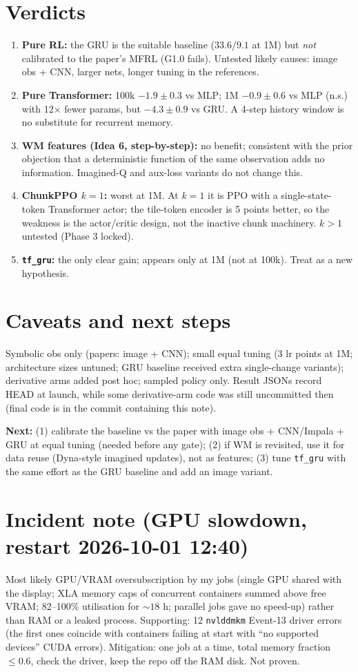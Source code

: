 \documentclass[10pt]{article}
\newcommand{\p}[1]{\texttt{\small #1}}
\begin{document}
\section*{Verdicts}
\begin{enumerate}\itemsep0pt
\item \textbf{Pure RL:} the GRU is the suitable baseline ($33.6/9.1$ at 1M) but \emph{not} calibrated to the paper's MFRL (G1.0 fails). Untested likely causes: image obs + CNN, larger nets, longer tuning in the references.
\item \textbf{Pure Transformer:} 100k $-1.9\pm0.3$ vs MLP; 1M $-0.9\pm0.6$ vs MLP (n.s.) with 12$\times$ fewer params, but $-4.3\pm0.9$ vs GRU. A 4-step history window is no substitute for recurrent memory.
\item \textbf{WM features (Idea 6, step-by-step):} no benefit; consistent with the prior objection that a deterministic function of the same observation adds no information. Imagined-Q and aux-loss variants do not change this.
\item \textbf{ChunkPPO $k{=}1$:} worst at 1M. At $k{=}1$ it is PPO with a single-state-token Transformer actor; the tile-token encoder is 5 points better, so the weakness is the actor/critic design, not the inactive chunk machinery. $k>1$ untested (Phase 3 locked).
\item \textbf{\p{tf\_gru}:} the only clear gain; appears only at 1M (not at 100k). Treat as a new hypothesis.
\end{enumerate}

\section*{Caveats and next steps}
Symbolic obs only (papers: image + CNN); small equal tuning (3 lr points at 1M; architecture sizes untuned; GRU baseline received extra single-change variants); derivative arms added post hoc; sampled policy only. Result JSONs record HEAD at launch, while some derivative-arm code was still uncommitted then (final code is in the commit containing this note).

\textbf{Next:} (1) calibrate the baseline vs the paper with image obs + CNN/Impala + GRU at equal tuning (needed before any gate); (2) if WM is revisited, use it for data reuse (Dyna-style imagined updates), not as features; (3) tune \p{tf\_gru} with the same effort as the GRU baseline and add an image variant.

\section*{Incident note (GPU slowdown, restart 2026-10-01 12:40)}
Most likely GPU/VRAM oversubscription by my jobs (single GPU shared with the display; XLA memory caps of concurrent containers summed above free VRAM; 82--100\% utilisation for ${\sim}18$ h; parallel jobs gave no speed-up) rather than RAM or a leaked process. Supporting: 12 \p{nvlddmkm} Event-13 driver errors (the first ones coincide with containers failing at start with ``no supported devices'' CUDA errors). Mitigation: one job at a time, total memory fraction $\le0.6$, check the driver, keep the repo off the RAM disk. Not proven.
\end{document}
